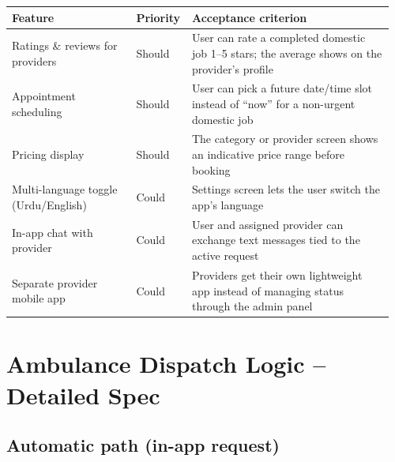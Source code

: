 \documentclass[11pt,a4paper]{article}
\begin{document}
\begin{longtable}{p{0.32\linewidth} p{0.12\linewidth} p{0.52\linewidth}}
\toprule
\textbf{Feature} & \textbf{Priority} & \textbf{Acceptance criterion} \\
\midrule
\endhead
Ratings \& reviews for providers & Should & User can rate a completed domestic job 1--5 stars; the average shows on the provider's profile \\
\addlinespace
Appointment scheduling & Should & User can pick a future date/time slot instead of ``now'' for a non-urgent domestic job \\
\addlinespace
Pricing display & Should & The category or provider screen shows an indicative price range before booking \\
\addlinespace
Multi-language toggle (Urdu/English) & Could & Settings screen lets the user switch the app's language \\
\addlinespace
In-app chat with provider & Could & User and assigned provider can exchange text messages tied to the active request \\
\addlinespace
Separate provider mobile app & Could & Providers get their own lightweight app instead of managing status through the admin panel \\
\bottomrule
\end{longtable}

\section{Ambulance Dispatch Logic -- Detailed Spec}

\subsection{Automatic path (in-app request)}
\end{document}
